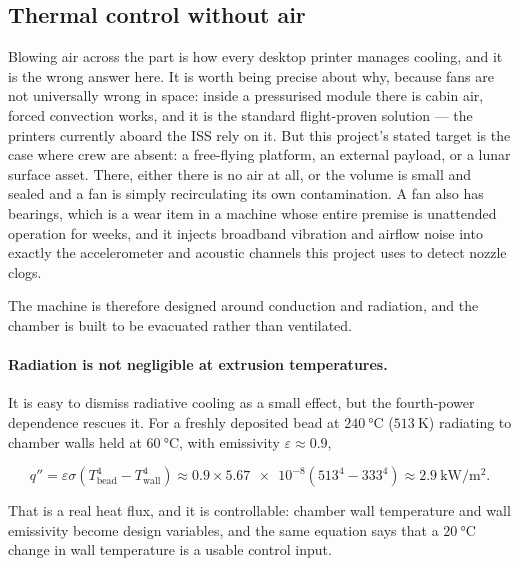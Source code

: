 \documentclass[11pt,a4paper]{article}
\begin{document}
\subsection{Thermal control without air}
\label{sec:thermal}

Blowing air across the part is how every desktop printer manages cooling, and it
is the wrong answer here. It is worth being precise about why, because fans are
not universally wrong in space: inside a pressurised module there is cabin air,
forced convection works, and it is the standard flight-proven solution --- the
printers currently aboard the ISS rely on it. But this project's stated target is
the case where crew are absent: a free-flying platform, an external payload, or a
lunar surface asset. There, either there is no air at all, or the volume is small
and sealed and a fan is simply recirculating its own contamination. A fan also
has bearings, which is a wear item in a machine whose entire premise is
unattended operation for weeks, and it injects broadband vibration and airflow
noise into exactly the accelerometer and acoustic channels this project uses to
detect nozzle clogs.

The machine is therefore designed around conduction and radiation, and the
chamber is built to be evacuated rather than ventilated.

\paragraph{Radiation is not negligible at extrusion temperatures.} It is easy to
dismiss radiative cooling as a small effect, but the fourth-power dependence
rescues it. For a freshly deposited bead at \(\SI{240}{\celsius}\)
(\(\SI{513}{\kelvin}\)) radiating to chamber walls held at
\(\SI{60}{\celsius}\), with emissivity \(\varepsilon \approx 0.9\),

\begin{equation}
  q'' = \varepsilon\sigma\left(T_\text{bead}^{4}-T_\text{wall}^{4}\right)
      \approx 0.9 \times \num{5.67e-8}\left(513^{4}-333^{4}\right)
      \approx \SI{2.9}{\kilo\watt\per\metre\squared}.
\end{equation}

That is a real heat flux, and it is controllable: chamber wall temperature and
wall emissivity become design variables, and the same equation says that a
\(\SI{20}{\celsius}\) change in wall temperature is a usable control input.
\end{document}
